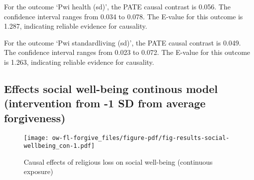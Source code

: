 \documentclass[
  singlecolumn]{report}
\begin{document}
For the outcome `Pwi health (sd)', the PATE causal contrast is 0.056.
The confidence interval ranges from 0.034 to 0.078. The E-value for this
outcome is 1.287, indicating reliable evidence for causality.

For the outcome `Pwi standardliving (sd)', the PATE causal contrast is
0.049. The confidence interval ranges from 0.023 to 0.072. The E-value
for this outcome is 1.263, indicating reliable evidence for causality.

\hypertarget{effects-social-well-being-continous-model-intervention-from--1-sd-from-average-forgiveness}{%
\subsection{Effects social well-being continous model (intervention from
-1 SD from average
forgiveness)}\label{effects-social-well-being-continous-model-intervention-from--1-sd-from-average-forgiveness}}

\begin{figure}

{\centering \texttt{[image: ow-fl-forgive\_files/figure-pdf/fig-results-social-wellbeing\_con-1.pdf]}

}

\caption{\label{fig-results-social-wellbeing_con}Causal effects of
religious loss on social well-being (continuous exposure)}

\end{figure}
\end{document}
